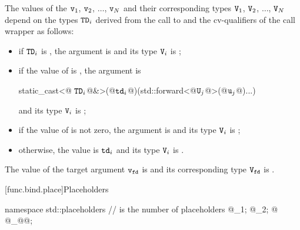 \pnum
{}%
The values of the  $\tcode{v}_1$, $\tcode{v}_2$, $\dotsc$, $\tcode{v}_N$ and their
corresponding types $\tcode{V}_1$, $\tcode{V}_2$, $\dotsc$, $\tcode{V}_N$ depend on the
types $\tcode{TD}_i$ derived from
the call to  and the
cv-qualifiers \cv{} of the call wrapper  as follows:
\begin{itemize}
\item if $\tcode{TD}_i$ is , the
argument is  and its type $\tcode{V}_i$ is ;

\item if the value of 
is , the argument is
\begin{codeblock}
static_cast<@\cv{} $\tcode{TD}_i$@&>(@$\tcode{td}_i$@)(std::forward<@$\tcode{U}_j$@>(@$\tcode{u}_j$@)...)
\end{codeblock}
and its type $\tcode{V}_i$ is
;

\item if the value  of 
is not zero, the  argument is 
and its type $\tcode{V}_i$
is ;

\item otherwise, the value is $\tcode{td}_i$ and its type $\tcode{V}_i$
is .
\end{itemize}

\pnum
The value of the target argument $\tcode{v}_\tcode{fd}$ is  and
its corresponding type $\tcode{V}_\tcode{fd}$ is .
%

[func.bind.place]{Placeholders}

%
%
%
%
%
%
%
%
%
%
%
\begin{codeblock}
namespace std::placeholders {
  //  is the number of placeholders
  @\seebelow@ _1;
  @\seebelow@ _2;
             @\itcorr\vdots@
  @\seebelow@ _@@;
}
\end{codeblock}

